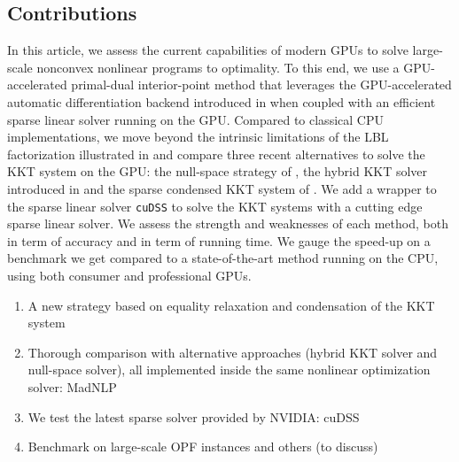 \subsection{Contributions}
In this article, we assess the current capabilities of modern GPUs
to solve large-scale nonconvex nonlinear programs to optimality.
To this end, we use a GPU-accelerated primal-dual interior-point method
that leverages the GPU-accelerated automatic differentiation
backend introduced in \cite{shin2023accelerating} when coupled with
an efficient sparse linear solver running on the GPU.
Compared to classical CPU implementations,
we move beyond the intrinsic limitations of the LBL factorization
illustrated in \cite{tasseff2019exploring,swirydowicz2021linear} and
compare three recent alternatives to solve the KKT system on the GPU:
the null-space strategy of \cite{pacaud2022condensed}, the hybrid
KKT solver introduced in \cite{regev2023hykkt} and the sparse
condensed KKT system of \cite{shin2023accelerating}.
We add a wrapper to the sparse linear solver {\tt cuDSS} to solve
the KKT systems with a cutting edge sparse linear solver.
We assess the strength
and weaknesses of each method, both in term of accuracy and in term of running time.
We gauge the speed-up on a benchmark we get compared to a state-of-the-art method running
on the CPU, using both consumer and professional GPUs.

\begin{enumerate}
  \item A new strategy based on equality relaxation
    and condensation of the KKT system
  \item Thorough comparison with alternative approaches
    (hybrid KKT solver and null-space solver), all implemented
    inside the same nonlinear optimization solver: MadNLP
  \item We test the latest sparse solver provided
    by NVIDIA: cuDSS
  \item Benchmark on large-scale OPF instances
    and others (to discuss)
\end{enumerate}

